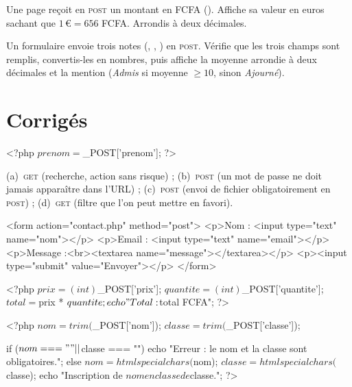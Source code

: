 Une page reçoit en \textsc{post} un montant en FCFA ().
Affiche sa valeur en euros sachant que $1\,\text{€} = 656$ FCFA. Arrondis à deux
décimales.

Un formulaire envoie trois notes (, , ) en
\textsc{post}. Vérifie que les trois champs sont remplis, convertis-les en
nombres, puis affiche la moyenne arrondie à deux décimales et la mention
(\emph{Admis} si moyenne $\geq 10$, sinon \emph{Ajourné}).

\section{Corrigés}

\begin{codephp}
<?php
  $prenom = $_POST['prenom'];
?>
\end{codephp}

(a)~\textsc{get} (recherche, action sans risque) ;
(b)~\textsc{post} (un mot de passe ne doit jamais apparaître dans l'URL) ;
(c)~\textsc{post} (envoi de fichier obligatoirement en \textsc{post}) ;
(d)~\textsc{get} (filtre que l'on peut mettre en favori).

\begin{codehtml}
<form action="contact.php" method="post">
  <p>Nom : <input type="text" name="nom"></p>
  <p>Email : <input type="text" name="email"></p>
  <p>Message :<br><textarea name="message"></textarea></p>
  <p><input type="submit" value="Envoyer"></p>
</form>
\end{codehtml}

\begin{codephp}
<?php
  $prix     = (int) $_POST['prix'];
  $quantite = (int) $_POST['quantite'];
  $total    = $prix * $quantite;
  echo "Total : $total FCFA";
?>
\end{codephp}

\begin{codephp}
<?php
  $nom    = trim($_POST['nom']);
  $classe = trim($_POST['classe']);

  if ($nom === "" || $classe === "") {
    echo "Erreur : le nom et la classe sont obligatoires.";
  } else {
    $nom    = htmlspecialchars($nom);
    $classe = htmlspecialchars($classe);
    echo "Inscription de $nom en classe de $classe.";
  }
?>
\end{codephp}

